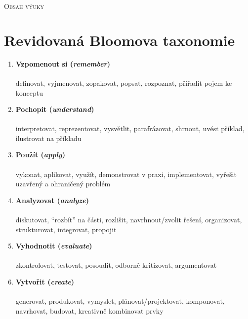 \textsc{Obsah výuky}\\

\newpage

\chapter*{Revidovaná Bloomova taxonomie}
\label{bloom}
\vspace{-0.5em}
\vspace{-0.3em}

\begin{enumerate}[leftmargin=*]
\item \textbf{Vzpomenout si (\textit{remember})}\\
\\
{\small definovat, vyjmenovat, zopakovat, popsat, rozpoznat, přiřadit pojem ke konceptu}

\item \textbf{Pochopit (\textit{understand})}\\
\\
{\small interpretovat, reprezentovat, vysvětlit, parafrázovat, shrnout, uvést příklad, ilustrovat na příkladu}

\item \textbf{Použít (\textit{apply})}\\
\\
{\small vykonat, aplikovat, využít, demonstrovat v praxi, implementovat, vyřešit uzavřený a ohraničený problém}

\item \textbf{Analyzovat (\textit{analyze})}\\
\\
{\small diskutovat, \enquote{rozbít} na části, rozlišit, navrhnout/zvolit řešení, organizovat, strukturovat, integrovat, propojit}

\item \textbf{Vyhodnotit (\textit{evaluate})}\\
\\
{\small zkontrolovat, testovat, posoudit, odborně kritizovat, argumentovat}

\item \textbf{Vytvořit (\textit{create})}\\
\\
{\small generovat, produkovat, vymyslet, plánovat/projektovat, komponovat, navrhovat, budovat, kreativně kombinovat prvky}
\end{enumerate}

